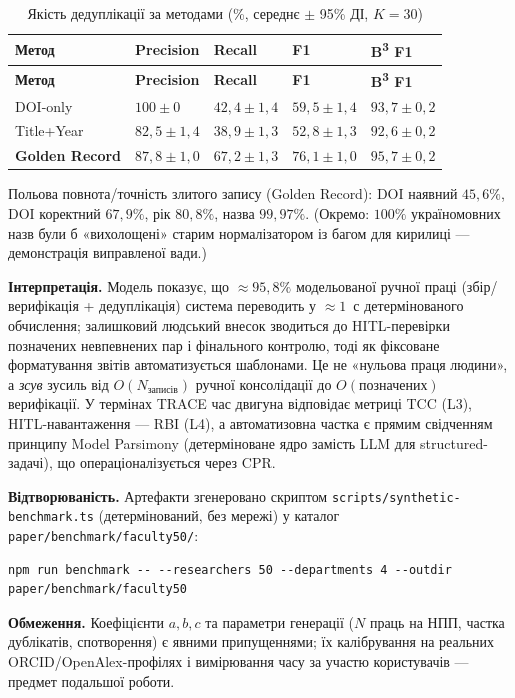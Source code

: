 \begin{longtable}{@{}p{}p{}p{}p{}p{}@{}}
\caption{Якість дедуплікації за методами (\%, середнє $\pm$ 95\% ДІ, $K=30$)}\label{tab:quality-50}\\
\toprule
\textbf{Метод} & \textbf{Precision} & \textbf{Recall} & \textbf{F1} & \textbf{B\textsuperscript{3} F1} \\
\midrule
\endfirsthead
\toprule
\textbf{Метод} & \textbf{Precision} & \textbf{Recall} & \textbf{F1} & \textbf{B\textsuperscript{3} F1} \\
\midrule
\endhead
DOI-only & $100\pm0$ & $42{,}4\pm1{,}4$ & $59{,}5\pm1{,}4$ & $93{,}7\pm0{,}2$ \\
Title+Year & $82{,}5\pm1{,}4$ & $38{,}9\pm1{,}3$ & $52{,}8\pm1{,}3$ & $92{,}6\pm0{,}2$ \\
\textbf{Golden Record} & $87{,}8\pm1{,}0$ & $67{,}2\pm1{,}3$ & $76{,}1\pm1{,}0$ & $95{,}7\pm0{,}2$ \\
\bottomrule
\end{longtable}

Польова повнота/точність злитого запису (Golden Record): DOI наявний $45{,}6\%$, DOI коректний $67{,}9\%$, рік $80{,}8\%$, назва $99{,}97\%$. (Окремо: $100\%$ україномовних назв були б «вихолощені» старим нормалізатором із багом для кирилиці --- демонстрація виправленої вади.)

\textbf{Інтерпретація.} Модель показує, що $\approx 95{,}8\%$ модельованої ручної праці (збір/верифікація + дедуплікація) система переводить у $\approx 1$~с детермінованого обчислення; залишковий людський внесок зводиться до HITL-перевірки позначених невпевнених пар і фінального контролю, тоді як фіксоване форматування звітів автоматизується шаблонами. Це не «нульова праця людини», а \emph{зсув} зусиль від $O(N_{\text{записів}})$ ручної консолідації до $O(\text{позначених})$ верифікації.
\iftrace
У термінах TRACE час двигуна відповідає метриці TCC (L3), HITL-навантаження --- RBI (L4), а автоматизовна частка є прямим свідченням принципу Model Parsimony (детерміноване ядро замість LLM для structured-задачі), що операціоналізується через CPR.
\fi

\textbf{Відтворюваність.} Артефакти згенеровано скриптом \texttt{scripts/synthetic-benchmark.ts} (детермінований, без мережі) у каталог \texttt{paper/benchmark/faculty50/}:
\begin{lstlisting}
npm run benchmark -- --researchers 50 --departments 4 --outdir paper/benchmark/faculty50
\end{lstlisting}
\textbf{Обмеження.} Коефіцієнти $a,b,c$ та параметри генерації ($N$ праць на НПП, частка дублікатів, спотворення) є явними припущеннями; їх калібрування на реальних ORCID/OpenAlex-профілях і вимірювання часу за участю користувачів --- предмет подальшої роботи.
